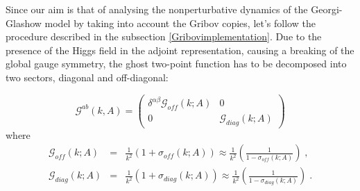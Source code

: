 Since our aim is that of analysing the nonperturbative dynamics of the Georgi-Glashow model by taking into account the Gribov copies, let's follow the procedure described in the subsection \ref{Gribovimplementation}. Due to the presence of the Higgs field in the adjoint representation, causing a breaking of the global gauge symmetry, the ghost two-point function has to be decomposed into two sectors, diagonal and off-diagonal:

\begin{equation}
\mathcal{G}^{ab}(k,A)=\left(
\begin{array}{cc}
\delta^{\alpha \beta}\mathcal{G}_{off}(k;A) & 0 \\
0 & \mathcal{G}_{diag}(k;A)
\end{array}
\right)
\end{equation}
where
\begin{eqnarray}
\mathcal{G}_{off}(k;A) 
&=&  \frac{1}{k^{2}}   \left( 1+\sigma _{off}(k;A)\right)       \approx \frac{1}{k^{2}}  \left( \frac{1}{1-\sigma
_{off}(k;A)}\right) 
\label{Goff} \;,  \\[5mm]
\mathcal{G}_{diag}(k;A) 
&=&  \frac{1}{k^{2}}  \left( 1+\sigma _{diag}(k;A)\right)  \approx \frac{1}{k^{2}}\left( \frac{1}{1-\sigma
_{diag}(k;A)}\right) \label{Gdiag} \;.
\end{eqnarray}


